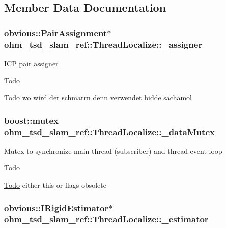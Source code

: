 \subsection{Member Data Documentation}
\hypertarget{classohm__tsd__slam__ref_1_1ThreadLocalize_a45c7b109a3a9f22e0c60111c58eb0dd3}{
\subsubsection[{\-\_\-assigner}]{\setlength{\rightskip}{0pt plus 5cm}obvious\-::\-Pair\-Assignment$\ast$ ohm\-\_\-tsd\-\_\-slam\-\_\-ref\-::\-Thread\-Localize\-::\-\_\-assigner\hspace{0.3cm}{\ttfamily [private]}}}\label{classohm__tsd__slam__ref_1_1ThreadLocalize_a45c7b109a3a9f22e0c60111c58eb0dd3}
I\-C\-P pair assigner \begin{DoxyRefDesc}{Todo}
\item[\hyperlink{todo__todo000022}{Todo}]wo wird der schmarrn denn verwendet bidde sachamol \end{DoxyRefDesc}
\hypertarget{classohm__tsd__slam__ref_1_1ThreadLocalize_ad1b612e37ab54ffe1958cac7d5f9c89c}{
\subsubsection[{\-\_\-data\-Mutex}]{\setlength{\rightskip}{0pt plus 5cm}boost\-::mutex ohm\-\_\-tsd\-\_\-slam\-\_\-ref\-::\-Thread\-Localize\-::\-\_\-data\-Mutex\hspace{0.3cm}{\ttfamily [private]}}}\label{classohm__tsd__slam__ref_1_1ThreadLocalize_ad1b612e37ab54ffe1958cac7d5f9c89c}
Mutex to synchronize main thread (subscriber) and thread event loop \begin{DoxyRefDesc}{Todo}
\item[\hyperlink{todo__todo000020}{Todo}]either this or flags obsolete \end{DoxyRefDesc}
\hypertarget{classohm__tsd__slam__ref_1_1ThreadLocalize_a34dc7fcb1cc798542270309014f09b93}{
\subsubsection[{\-\_\-estimator}]{\setlength{\rightskip}{0pt plus 5cm}obvious\-::\-I\-Rigid\-Estimator$\ast$ ohm\-\_\-tsd\-\_\-slam\-\_\-ref\-::\-Thread\-Localize\-::\-\_\-estimator\hspace{0.3cm}{\ttfamily [private]}}}\label{classohm__tsd__slam__ref_1_1ThreadLocalize_a34dc7fcb1cc798542270309014f09b93}
